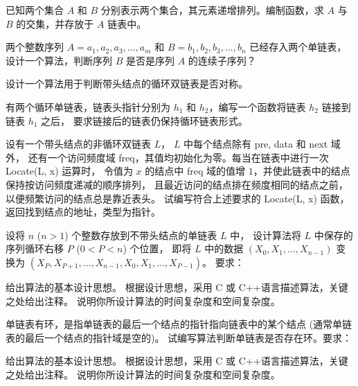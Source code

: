 \begin{qitems}
    \begin{bbox}
        \qitem 已知两个集合 $A$ 和 $B$ 分别表示两个集合，其元素递增排列。编制函数，求 $A$ 与 $B$ 的交集，并存放于 $A$ 链表中。
    \end{bbox}

    \begin{bbox}
        \qitem 两个整数序列 $A=a_1, a_2, a_3, \dots, a_m$ 和 $B=b_1, b_2, b_3, \dots, b_n$ 已经存入两个单链表，设计一个算法，判断序列 $B$ 是否是序列 $A$ 的连续子序列？
    \end{bbox}

    \begin{bbox}
        \qitem 设计一个算法用于判断带头结点的循环双链表是否对称。
    \end{bbox}

    \begin{bbox}
        \qitem 有两个循环单链表，链表头指针分别为 $h_1$ 和 $h_2$，编写一个函数将链表 $h_2$ 链接到链表 $h_1$ 之后，
        要求链接后的链表仍保持循环链表形式。
    \end{bbox}

    \begin{bbox}
        \qitem 设有一个带头结点的非循环双链表 $L$， $L$ 中每个结点除有 pre, data 和 next 域外，
        还有一个访问频度域 freq，其值均初始化为零。每当在链表中进行一次 Locate(L, x) 运算时，
        令值为 $x$ 的结点中 freq 域的值增 $1$，并使此链表中的结点保持按访问频度递减的顺序排列，
        且最近访问的结点排在频度相同的结点之前，以便频繁访问的结点总是靠近表头。
        试编写符合上述要求的 Locate(L, x) 函数，返回找到结点的地址，类型为指针。
    \end{bbox}

    \begin{bbox}
        \qitem 设将 $n$ ($n>1$) 个整数存放到不带头结点的单链表 $L$ 中，
        设计算法将 $L$ 中保存的序列循环右移 $P$ ($0<P<n$) 个位置，
        即将 $L$ 中的数据 $(X_0, X_1, \dots, X_{n-1})$ 变换为 $(X_P, X_{P+1}, \dots, X_{n-1}, X_0, X_1, \dots, X_{P-1})$。
        要求：
        \begin{subqitems}
            \subqitem 给出算法的基本设计思想。
            \subqitem 根据设计思想，采用 C 或 C++语言描述算法，关键之处给出注释。
            \subqitem 说明你所设计算法的时间复杂度和空间复杂度。
        \end{subqitems}
    \end{bbox}

    \begin{bbox}
        \qitem 单链表有环，是指单链表的最后一个结点的指针指向链表中的某个结点 (通常单链表的最后一个结点的指针域是空的)。
        试编写算法判断单链表是否存在环。要求：
        \begin{subqitems}
            \subqitem 给出算法的基本设计思想。
            \subqitem 根据设计思想，采用 C 或 C++语言描述算法，关键之处给出注释。
            \subqitem 说明你所设计算法的时间复杂度和空间复杂度。
        \end{subqitems}
    \end{bbox}


\end{qitems}

